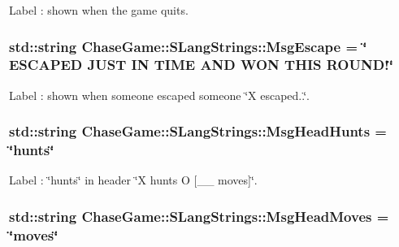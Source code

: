 Label \-: shown when the game quits. 

\hypertarget{struct_chase_game_1_1_s_lang_strings_ac77a3cbdbd63a66e69754666ee88cd78}{
\subsubsection[{Msg\-Escape}]{\setlength{\rightskip}{0pt plus 5cm}std\-::string Chase\-Game\-::\-S\-Lang\-Strings\-::\-Msg\-Escape = \char`\"{} E\-S\-C\-A\-P\-E\-D J\-U\-S\-T I\-N T\-I\-M\-E A\-N\-D W\-O\-N T\-H\-I\-S R\-O\-U\-N\-D!\char`\"{}}}\label{struct_chase_game_1_1_s_lang_strings_ac77a3cbdbd63a66e69754666ee88cd78}


Label \-: shown when someone escaped someone \char`\"{}\-X escaped..\char`\"{}. 

\hypertarget{struct_chase_game_1_1_s_lang_strings_ae50e2fb23b58db21d1e9eeae0724a480}{
\subsubsection[{Msg\-Head\-Hunts}]{\setlength{\rightskip}{0pt plus 5cm}std\-::string Chase\-Game\-::\-S\-Lang\-Strings\-::\-Msg\-Head\-Hunts = \char`\"{}hunts\char`\"{}}}\label{struct_chase_game_1_1_s_lang_strings_ae50e2fb23b58db21d1e9eeae0724a480}


Label \-: \char`\"{}hunts\char`\"{} in header \char`\"{}\-X hunts O \mbox{[}\-\_\-\-\_\- moves\mbox{]}\char`\"{}. 

\hypertarget{struct_chase_game_1_1_s_lang_strings_a06fad00de9d27f4b289c01728ab55be1}{
\subsubsection[{Msg\-Head\-Moves}]{\setlength{\rightskip}{0pt plus 5cm}std\-::string Chase\-Game\-::\-S\-Lang\-Strings\-::\-Msg\-Head\-Moves = \char`\"{}moves\char`\"{}}}\label{struct_chase_game_1_1_s_lang_strings_a06fad00de9d27f4b289c01728ab55be1}


